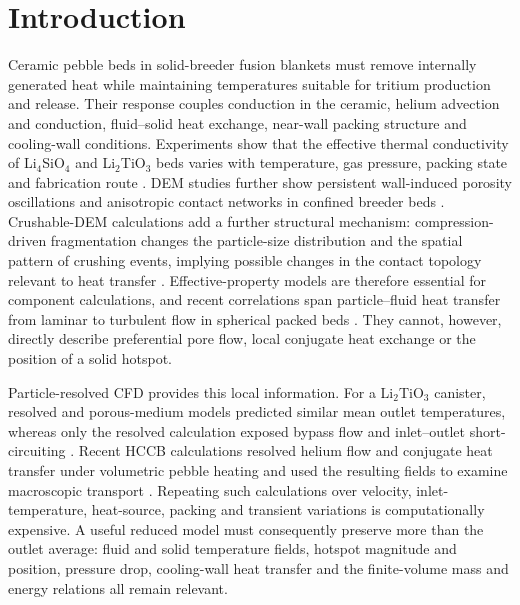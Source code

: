 \documentclass[preprint,12pt]{elsarticle}
\newcommand{\LiSi}{Li$_4$SiO$_4$}
\begin{document}
\linenumbers

\section{Introduction}

Ceramic pebble beds in solid-breeder fusion blankets must remove internally
generated heat while maintaining temperatures suitable for tritium production
and release. Their response couples conduction in the ceramic, helium
advection and conduction, fluid--solid heat exchange, near-wall packing
structure and cooling-wall conditions. Experiments show that the effective
thermal conductivity of \LiSi{} and Li$_2$TiO$_3$ beds varies with temperature,
gas pressure, packing state and fabrication route
\cite{wang2020conductivity,patel2021hotwire,pupeschi2019thermal}. DEM studies
further show persistent wall-induced porosity oscillations and anisotropic
contact networks in confined breeder beds
\cite{gong2017hccbpacking,wang2021anisotropic}. Crushable-DEM calculations
add a further structural mechanism: compression-driven fragmentation changes
the particle-size distribution and the spatial pattern of crushing events,
implying possible changes in the contact topology relevant to heat transfer
\cite{wang2026crushable}. Effective-property models are
therefore essential for component calculations, and recent correlations span
particle--fluid heat transfer from laminar to turbulent flow in spherical
packed beds \cite{wu2025particlefluid}. They cannot, however, directly describe
preferential pore flow, local conjugate heat exchange or the position of a
solid hotspot.

Particle-resolved CFD provides this local information. For a Li$_2$TiO$_3$
canister, resolved and porous-medium models predicted similar mean outlet
temperatures, whereas only the resolved calculation exposed bypass flow and
inlet--outlet short-circuiting \cite{sharma2020purge}. Recent HCCB calculations
resolved helium flow and conjugate heat transfer under volumetric pebble
heating and used the resulting fields to examine macroscopic transport
\cite{wang2023pore,wang2024macro}. Repeating such calculations over velocity,
inlet-temperature, heat-source, packing and transient variations is
computationally expensive. A useful reduced model must consequently preserve
more than the outlet average: fluid and solid temperature fields, hotspot
magnitude and position, pressure drop, cooling-wall heat transfer and the
finite-volume mass and energy relations all remain relevant.
\end{document}
